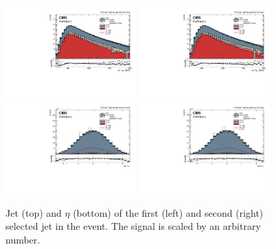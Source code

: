 \begin{figure}[h!]
\centering
\includegraphics[width=0.450\textwidth]{figures/analysis/search3/AN-17-303/controlPlots/looseSel_Jet_1_p_T.pdf}
\includegraphics[width=0.450\textwidth]{figures/analysis/search3/AN-17-303/controlPlots/looseSel_Jet_2_p_T.pdf}\\
\includegraphics[width=0.450\textwidth]{figures/analysis/search3/AN-17-303/controlPlots/looseSel_Jet_1_eta.pdf}
\includegraphics[width=0.450\textwidth]{figures/analysis/search3/AN-17-303/controlPlots/looseSel_Jet_2_eta.pdf}
\caption{Jet \PT{} (top) and $\eta$ (bottom) of the first (left) and second (right) selected jet in the event. The signal is scaled by an arbitrary number.}
\label{fig:kinematics-all}
\end{figure}

